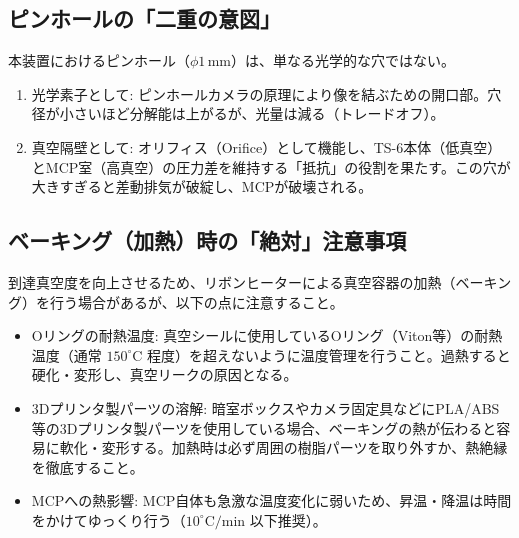 \subsection{ピンホールの「二重の意図」}
本装置におけるピンホール（$\phi 1\,\mathrm{mm}$）は、単なる光学的な穴ではない。
\begin{enumerate}
    \item 光学素子として: ピンホールカメラの原理により像を結ぶための開口部。穴径が小さいほど分解能は上がるが、光量は減る（トレードオフ）。
    \item 真空隔壁として: オリフィス（Orifice）として機能し、TS-6本体（低真空）とMCP室（高真空）の圧力差を維持する「抵抗」の役割を果たす。この穴が大きすぎると差動排気が破綻し、MCPが破壊される。
\end{enumerate}

\subsection{ベーキング（加熱）時の「絶対」注意事項}
到達真空度を向上させるため、リボンヒーターによる真空容器の加熱（ベーキング）を行う場合がある\cite{Takeda2023}が、以下の点に注意すること。

\begin{itemize}
    \item Oリングの耐熱温度:
    真空シールに使用しているOリング（Viton等）の耐熱温度（通常 $150^\circ\mathrm{C}$ 程度）を超えないように温度管理を行うこと。過熱すると硬化・変形し、真空リークの原因となる。
    \item 3Dプリンタ製パーツの溶解:
    暗室ボックスやカメラ固定具などにPLA/ABS等の3Dプリンタ製パーツを使用している場合、ベーキングの熱が伝わると容易に軟化・変形する。加熱時は必ず周囲の樹脂パーツを取り外すか、熱絶縁を徹底すること。
    \item MCPへの熱影響:
    MCP自体も急激な温度変化に弱いため、昇温・降温は時間をかけてゆっくり行う（$10^\circ\mathrm{C}/\mathrm{min}$ 以下推奨）。
\end{itemize}